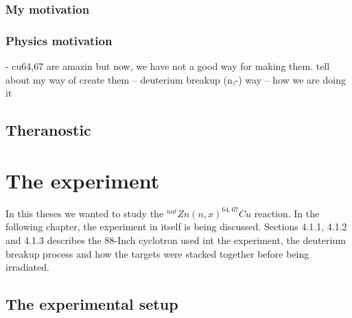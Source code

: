 \documentclass[twoside,english]{uiofysmaster/uiofysmaster}
\begin{document}
\subsection{My motivation}
\label{sec: my_motivation}




\subsection{Physics motivation}
\label{sec: physics_motivation}

- cu64,67 are amazin but now, we have not a good way for making them. tell about my way of create them
-- deuterium breakup (n,-) way
-- how we are doing it


\section{Theranostic}
\label{sec:theranostic}


\chapter{The experiment}
\label{ch: experiment}

In this theses we wanted to study the $^{nat}Zn(n,x)^{64,67}Cu$ reaction. 
In the following chapter, the experiment in itself is being discussed. Sections 4.1.1, 4.1.2 and 4.1.3 describes the 88-Inch cyclotron used int the experiment, the deuterium breakup process and how the targets were stacked together before being irradiated.


\section{The experimental setup}
\label{sec: setup}
\end{document}
